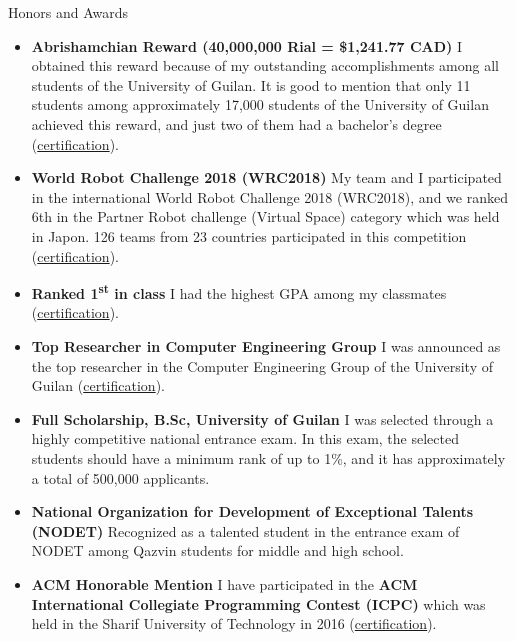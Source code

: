 \documentclass[]{mcdowellcv}
\begin{document}
    
    \begin{cvsection}{Honors and Awards}
    	\begin{cvsubsection}{}{}{}	
    		\begin{itemize}
    		    \item \textbf{Abrishamchian Reward (40,000,000 Rial = \$1,241.77 CAD)} \newline
                I obtained this reward because of my outstanding accomplishments among all students of the University of Guilan.
                It is good to mention that only 11 students among approximately 17,000 students of the University of Guilan achieved this reward, and just two of them had a bachelor's degree (\href{https://www.dropbox.com/s/avfvpvrg5pftjuc/Abrishamchian\%27s\%20Reward.png?dl=0}{certification}).
    			\item \textbf{World Robot Challenge 2018 (WRC2018)} \newline
                My team and I participated in the international World Robot Challenge 2018 (WRC2018), and we ranked 6th in the Partner Robot challenge (Virtual Space) category which was held in Japon. 126 teams from 23 countries participated in this competition (\href{https://www.dropbox.com/s/bp9kqpk0mmomlhz/World\%20Robot\%20Summit\%20Certification.jpg?dl=0}{certification}).
    			\item \textbf{Ranked 1\textsuperscript{st} in class} \newline
    			I had the highest GPA among my classmates (\href{https://www.dropbox.com/s/auc8cztccy4n15u/Ranked\%20First.jpg?dl=0}{certification}).
    			\item \textbf{Top Researcher in Computer Engineering Group} \newline
                I was announced as the top researcher in the Computer Engineering Group of the University of Guilan (\href{https://www.dropbox.com/s/sf187sfu1cetzzw/Top\%20Researcher\%20in\%20Computer\%20Engineering\%20Group\%20Certification.jpg?dl=0}{certification}).
    			\item \textbf{Full Scholarship, B.Sc, University of Guilan} \newline
                I was selected through a highly competitive national entrance exam. In this exam, the selected students should have a minimum rank of up to 1\%,  and it has approximately a total of 500,000 applicants.
                \item \textbf{National Organization for Development of Exceptional Talents (NODET)} \newline
                Recognized as a talented student in the entrance exam of NODET among Qazvin students for middle and high school.
                \item \textbf{ACM Honorable Mention} \newline
              I have participated in the \textbf{ACM International Collegiate Programming Contest (ICPC)} which was held in the Sharif University of Technology in 2016 (\href{https://www.dropbox.com/s/t3nfzaavpyrf8os/ACM\%20certification.pdf?dl=0}{certification}).
    		\end{itemize}
    	\end{cvsubsection}
    \end{cvsection}
    
\end{document}
